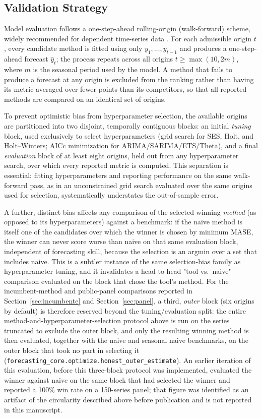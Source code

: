 \documentclass[forecasting,article,submit,pdftex,moreauthors]{Definitions/mdpi}
\begin{document}
\subsection{Validation Strategy}
\label{sec:validation}

Model evaluation follows a one-step-ahead rolling-origin (walk-forward) scheme, widely recommended for dependent time-series data \cite{bergmeir2012,tashman2000}. For each admissible origin $t$, every candidate method is fitted using only $y_1,\dots,y_{t-1}$ and produces a one-step-ahead forecast $\hat y_t$; the process repeats across all origins $t \geq \max(10, 2m)$, where $m$ is the seasonal period used by the model. A method that fails to produce a forecast at any origin is excluded from the ranking rather than having its metric averaged over fewer points than its competitors, so that all reported methods are compared on an identical set of origins.

To prevent optimistic bias from hyperparameter selection, the available origins are partitioned into two disjoint, temporally contiguous blocks: an initial \emph{tuning} block, used exclusively to select hyperparameters (grid search for SES, Holt, and Holt--Winters; AICc minimization for ARIMA/SARIMA/ETS/Theta), and a final \emph{evaluation} block of at least eight origins, held out from any hyperparameter search, over which every reported metric is computed. This separation is essential: fitting hyperparameters and reporting performance on the same walk-forward pass, as in an unconstrained grid search evaluated over the same origins used for selection, systematically understates the out-of-sample error.

A further, distinct bias affects any comparison of the selected winning \emph{method} (as opposed to its hyperparameters) against a benchmark: if the naive method is itself one of the candidates over which the winner is chosen by minimum MASE, the winner can never score worse than naive on that same evaluation block, independent of forecasting skill, because the selection is an argmin over a set that includes naive. This is a subtler instance of the same selection-bias family as hyperparameter tuning, and it invalidates a head-to-head "tool vs.\ naive" comparison evaluated on the block that chose the tool's method. For the incumbent-method and public-panel comparisons reported in Section~\ref{sec:incumbente} and Section~\ref{sec:panel}, a third, \emph{outer} block (six origins by default) is therefore reserved beyond the tuning/evaluation split: the entire method-and-hyperparameter-selection protocol above is run on the series truncated to exclude the outer block, and only the resulting winning method is then evaluated, together with the naive and seasonal naive benchmarks, on the outer block that took no part in selecting it (\texttt{forecasting\_\allowbreak core.optimize.honest\_\allowbreak outer\_\allowbreak estimate}). An earlier iteration of this evaluation, before this three-block protocol was implemented, evaluated the winner against naive on the same block that had selected the winner and reported a 100\% win rate on a 150-series panel; that figure was identified as an artifact of the circularity described above before publication and is not reported in this manuscript.
\end{document}

